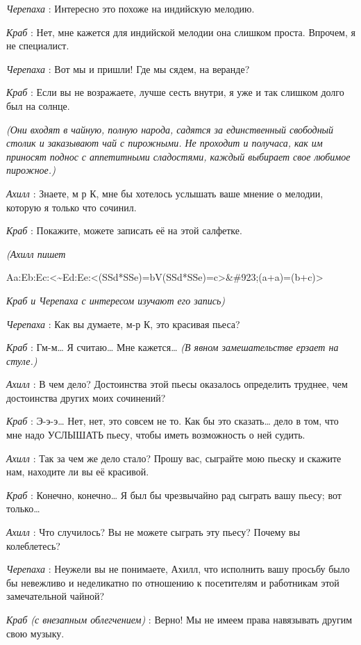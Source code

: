 \documentclass[../main.tex]{subfiles}
\begin{document}
\begin{dialogue}
\emph{Черепаха} : Интересно это похоже на индийскую мелодию.

\emph{Краб} : Нет, мне кажется для индийской мелодии она слишком проста. Впрочем, я не специалист.

\emph{Черепаха} : Вот мы и пришли! Где мы сядем, на веранде?

\emph{Краб} : Если вы не возражаете, лучше сесть внутри, я уже и так слишком долго был на солнце.

\emph{(Они входят в чайную, полную народа, садятся за единственный свободный столик и заказывают чай с пирожными. Не проходит и получаса, как им приносят поднос с аппетитными сладостями, каждый выбирает свое любимое пирожное.)}

\emph{Ахилл} : Знаете, м р К, мне бы хотелось услышать ваше мнение о мелодии, которую я только что сочинил.

\emph{Краб} : Покажите, можете записать её на этой салфетке.

\emph{(Ахилл пишет}

Aa:Eb:Ec:\textless\textasciitilde Ed:Ee:\textless(SSd*SSe)=bV(SSd*SSe)=c\textgreater\&\#923;(a+a)=(b+c)\textgreater{}

\emph{Краб и Черепаха с интересом изучают его запись)}

\emph{Черепаха} : Как вы думаете, м-р К, это красивая пьеса?

\emph{Краб} : Гм-м\ldots{} Я считаю\ldots{} Мне кажется\ldots{} \emph{(В явном замешательстве ерзает на стуле.)}

\emph{Ахилл} : В чем дело? Достоинства этой пьесы оказалось определить труднее, чем достоинства других моих сочинений?

\emph{Краб} : Э-э-э\ldots{} Нет, нет, это совсем не то. Как бы это сказать\ldots{} дело в том, что мне надо УСЛЫШАТЬ пьесу, чтобы иметь возможность о ней судить.

\emph{Ахилл} : Так за чем же дело стало? Прошу вас, сыграйте мою пьеску и скажите нам, находите ли вы её красивой.

\emph{Краб} : Конечно, конечно\ldots{} Я был бы чрезвычайно рад сыграть вашу пьесу; вот только\ldots{}

\emph{Ахилл} : Что случилось? Вы не можете сыграть эту пьесу? Почему вы колеблетесь?

\emph{Черепаха} : Неужели вы не понимаете, Ахилл, что исполнить вашу просьбу было бы невежливо и неделикатно по отношению к посетителям и работникам этой замечательной чайной?

\emph{Краб (с внезапным облегчением)} : Верно! Мы не имеем права навязывать другим свою музыку.


\end{dialogue}
\end{document}
